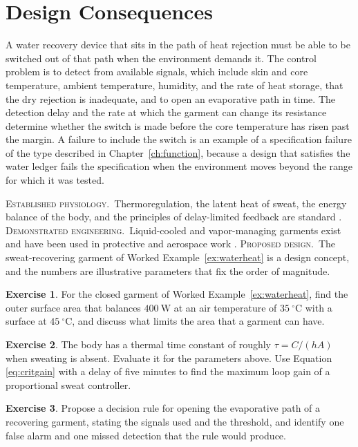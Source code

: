 \documentclass[11pt,openany]{book}
\theoremstyle{definition}
\newtheorem{exercise}{Exercise}[chapter]
\theoremstyle{remark}
\newcommand{\est}{\textsc{Established physiology.}\ }
\newcommand{\dem}{\textsc{Demonstrated engineering.}\ }
\newcommand{\pro}{\textsc{Proposed design.}\ }
\begin{document}
\section{Design Consequences}

A water recovery device that sits in the path of heat rejection must be able to be switched out of that path when the environment demands it. The control problem is to detect from available signals, which include skin and core temperature, ambient temperature, humidity, and the rate of heat storage, that the dry rejection is inadequate, and to open an evaporative path in time. The detection delay and the rate at which the garment can change its resistance determine whether the switch is made before the core temperature has risen past the margin. A failure to include the switch is an example of a specification failure of the type described in Chapter~\ref{ch:function}, because a design that satisfies the water ledger fails the specification when the environment moves beyond the range for which it was tested.

\begin{evidence}
\est Thermoregulation, the latent heat of sweat, the energy balance of the body, and the principles of delay-limited feedback are standard \cite{guyton2021,gagge1971,astrom2008}. \dem Liquid-cooled and vapor-managing garments exist and have been used in protective and aerospace work \cite{eckart1996}. \pro The sweat-recovering garment of Worked Example~\ref{ex:waterheat} is a design concept, and the numbers are illustrative parameters that fix the order of magnitude.
\end{evidence}

\begin{exercise}
For the closed garment of Worked Example~\ref{ex:waterheat}, find the outer surface area that balances $400\ \mathrm{W}$ at an air temperature of $35\ ^\circ\mathrm{C}$ with a surface at $45\ ^\circ\mathrm{C}$, and discuss what limits the area that a garment can have.
\end{exercise}

\begin{exercise}
The body has a thermal time constant of roughly $\tau=C/(hA)$ when sweating is absent. Evaluate it for the parameters above. Use Equation \eqref{eq:critgain} with a delay of five minutes to find the maximum loop gain of a proportional sweat controller.
\end{exercise}

\begin{exercise}
Propose a decision rule for opening the evaporative path of a recovering garment, stating the signals used and the threshold, and identify one false alarm and one missed detection that the rule would produce.
\end{exercise}
\end{document}
